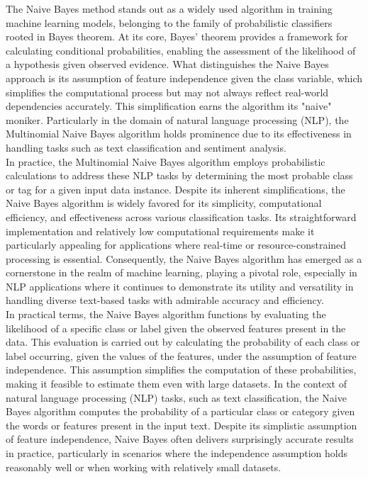 The Naive Bayes\cite{saifuzzaman2021machine} method stands out as a widely used algorithm in training machine learning models, belonging to the family of probabilistic classifiers rooted in Bayes theorem\cite{sidebotham2020most}. At its core, Bayes' theorem provides a framework for calculating conditional probabilities, enabling the assessment of the likelihood of a hypothesis given observed evidence. What distinguishes the Naive Bayes approach is its assumption of feature independence given the class variable, which simplifies the computational process but may not always reflect real-world dependencies accurately. This simplification earns the algorithm its "naive" moniker. Particularly in the domain of natural language processing (NLP), the Multinomial Naive Bayes algorithm holds prominence due to its effectiveness in handling tasks such as text classification and sentiment analysis.
\\
In practice, the Multinomial Naive Bayes algorithm employs probabilistic calculations to address these NLP tasks by determining the most probable class or tag for a given input data instance. Despite its inherent simplifications, the Naive Bayes algorithm is widely favored for its simplicity, computational efficiency, and effectiveness across various classification tasks. Its straightforward implementation and relatively low computational requirements make it particularly appealing for applications where real-time or resource-constrained processing is essential. Consequently, the Naive Bayes algorithm has emerged as a cornerstone in the realm of machine learning, playing a pivotal role, especially in NLP applications where it continues to demonstrate its utility and versatility in handling diverse text-based tasks with admirable accuracy and efficiency.
\\
In practical terms, the Naive Bayes algorithm functions by evaluating the likelihood of a specific class or label given the observed features present in the data. This evaluation is carried out by calculating the probability of each class or label occurring, given the values of the features, under the assumption of feature independence. This assumption simplifies the computation of these probabilities, making it feasible to estimate them even with large datasets. In the context of natural language processing (NLP) tasks, such as text classification, the Naive Bayes algorithm computes the probability of a particular class or category given the words or features present in the input text. Despite its simplistic assumption of feature independence, Naive Bayes often delivers surprisingly accurate results in practice, particularly in scenarios where the independence assumption holds reasonably well or when working with relatively small datasets.
